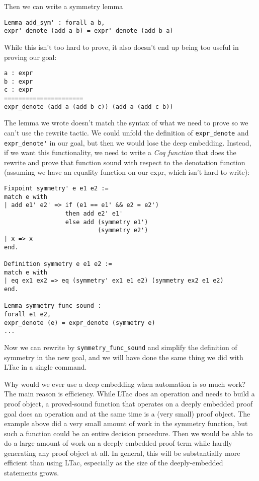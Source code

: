 \documentclass{puthesis}
\begin{document}
Then we can write a symmetry lemma

\begin{lstlisting}
Lemma add_sym' : forall a b, 
expr'_denote (add a b) = expr'_denote (add b a)
\end{lstlisting}

While this isn't too hard to prove, it also doesn't end up being too
useful in proving our goal:

\begin{lstlisting}
a : expr
b : expr
c : expr
======================
expr_denote (add a (add b c)) (add a (add c b))  
\end{lstlisting}

The lemma we wrote doesn't match the syntax of what we need to prove
so we can't use the rewrite tactic. We could unfold the definition of
\lstinline|expr_denote| and \lstinline|expr_denote'| in our goal, but
then we would lose the deep embedding. Instead, if we want this
functionality, we need to write a \emph{Coq function} that does the
rewrite and prove that function sound with respect to the denotation
function (assuming we have an equality function on our expr, which
isn't hard to write):

\begin{lstlisting}
Fixpoint symmetry' e e1 e2 := 
match e with
| add e1' e2' => if (e1 == e1' && e2 = e2') 
                 then add e2' e1' 
                 else add (symmetry e1') 
                          (symmetry e2')
| x => x
end.

Definition symmetry e e1 e2 :=
match e with
| eq ex1 ex2 => eq (symmetry' ex1 e1 e2) (symmetry ex2 e1 e2)
end.

Lemma symmetry_func_sound : 
forall e1 e2,
expr_denote (e) = expr_denote (symmetry e)
...
\end{lstlisting}

Now we can rewrite by \lstinline|symmetry_func_sound| and simplify the definition
of symmetry in the new goal, and we will have done the same thing we
did with LTac in a single command.

Why would we ever use a deep embedding when automation is so much
work? The main reason is efficiency. While LTac does an operation and
needs to build a proof object, a proved-sound function that operates on
a deeply embedded proof goal does an operation and at the same time is
a (very small) proof object. The example above did a very small amount
of work in the symmetry function, but such a function could be an
entire decision procedure. Then we would be able to do a large
amount of work on a deeply embedded proof term while hardly generating
any proof object at all. In general, this will be substantially more
efficient than using LTac, especially as the size of the
deeply-embedded statements grows. 
\end{document}
